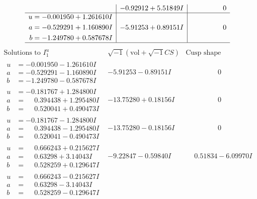 \documentclass[1p]{elsarticle_modified}
\theoremstyle{definition}
\newcommand{\I}{\sqrt{-1}}
\begin{document}
$$\begin{array}{c|c|c}
 & -0.92912 + 5.51849 I & \phantom{-0.000000 } 0 \\ \hline\begin{aligned}
u &= -0.001950 + 1.261610 I \\
a &= -0.529291 + 1.160890 I \\
b &= -1.249780 + 0.587678 I\end{aligned}
 & -5.91253 + 0.89151 I & \phantom{-0.000000 } 0\\
 \hline 
 \end{array}$$\newpage$$\begin{array}{c|c|c}  
\text{Solutions to }I^u_{1}& \I (\text{vol} + \sqrt{-1}CS) & \text{Cusp shape}\\
 \hline 
\begin{aligned}
u &= -0.001950 - 1.261610 I \\
a &= -0.529291 - 1.160890 I \\
b &= -1.249780 - 0.587678 I\end{aligned}
 & -5.91253 - 0.89151 I & \phantom{-0.000000 } 0 \\ \hline\begin{aligned}
u &= -0.181767 + 1.284800 I \\
a &= \phantom{-}0.394438 + 1.295480 I \\
b &= \phantom{-}0.520041 + 0.490473 I\end{aligned}
 & -13.75280 + 0.18156 I & \phantom{-0.000000 } 0 \\ \hline\begin{aligned}
u &= -0.181767 - 1.284800 I \\
a &= \phantom{-}0.394438 - 1.295480 I \\
b &= \phantom{-}0.520041 - 0.490473 I\end{aligned}
 & -13.75280 - 0.18156 I & \phantom{-0.000000 } 0 \\ \hline\begin{aligned}
u &= \phantom{-}0.666243 + 0.215627 I \\
a &= \phantom{-}0.63298 + 3.14043 I \\
b &= \phantom{-}0.528259 + 0.129647 I\end{aligned}
 & -9.22847 - 0.59840 I & \phantom{-}0.51834 - 6.09970 I \\ \hline\begin{aligned}
u &= \phantom{-}0.666243 - 0.215627 I \\
a &= \phantom{-}0.63298 - 3.14043 I \\
b &= \phantom{-}0.528259 - 0.129647 I\end{aligned}

\end{array}$$
\end{document}
